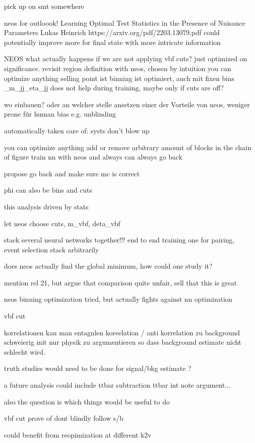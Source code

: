 
pick up on smt somewhere


neos
for outloook!
Learning Optimal Test Statistics in the Presence of
Nuisance Parameters
Lukas Heinrich
https://arxiv.org/pdf/2203.13079.pdf 
could potentially improve more for final state with more intricate information

NEOS
what actually happens if we are not applying vbf cuts? just optimized on significance.
revisit region definition with neos, chosen by intuition 
you can optimize anything 
selling point ist binning ist optimiert, auch mit fixen bins
_m_jj_eta_jj does not help during training, maybe only if cuts are off?


wo einbauen? oder an welcher stelle ansetzen
einer der Vorteile von neos, weniger prone für human bias e.g. unblinding

automatically taken care of: systs don't blow up

you can optimize anything
add or remove arbitrary amount of blocks in the chain of figure 
train nn with neos and always can always go back

propose go back and make sure mc is correct

phi can also be bins and cuts

this analysis driven by stats

let neos choose cuts,
m_vbf, deta_vbf


stack several neural networks together!!! end to end training 
one for pairing, event selection 
stack arbitrarily 

does neos actually find the global minimum, how could one study it?


mention rel 21, but argue that comparison quite unfair, sell that this is great


neos
binning optimization tried, but actually fights against nn optimization


vbf cut

korrelationen kan man entagnlen
koreelation / anti korrelation zu background schweierig mit nur physik zu argumentieren 
so dass background estimate nicht schlecht wird.

truth studies would need to be done for signal/bkg estimate ? 

a future analysis could include ttbar subtraction
ttbar int note argument...


also the question is which things would be useful to do 


vbf cut prove of dont blindly follow s/b

could benefit from reopimization at different k2v

